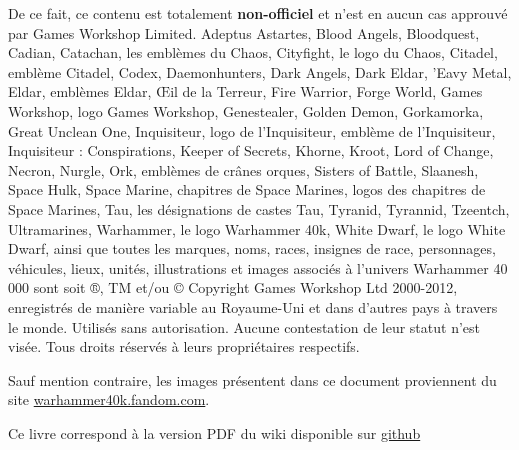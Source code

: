 De ce fait, ce contenu est totalement \textbf{non-officiel} et n'est en aucun cas approuvé par Games Workshop Limited. Adeptus Astartes, Blood Angels, Bloodquest, Cadian, Catachan, les emblèmes du Chaos, Cityfight, le logo du Chaos, Citadel, emblème Citadel, Codex, Daemonhunters, Dark Angels, Dark Eldar, 'Eavy Metal, Eldar, emblèmes Eldar, Œil de la Terreur, Fire Warrior, Forge World, Games Workshop, logo Games Workshop, Genestealer, Golden Demon, Gorkamorka, Great Unclean One, Inquisiteur, logo de l'Inquisiteur, emblème de l'Inquisiteur, Inquisiteur : Conspirations, Keeper of Secrets, Khorne, Kroot, Lord of Change, Necron, Nurgle, Ork, emblèmes de crânes orques, Sisters of Battle, Slaanesh, Space Hulk, Space Marine, chapitres de Space Marines, logos des chapitres de Space Marines, Tau, les désignations de castes Tau, Tyranid, Tyrannid, Tzeentch, Ultramarines, Warhammer, le logo Warhammer 40k, White Dwarf, le logo White Dwarf, ainsi que toutes les marques, noms, races, insignes de race, personnages, véhicules, lieux, unités, illustrations et images associés à l'univers Warhammer 40 000 sont soit ®, TM et/ou © Copyright Games Workshop Ltd 2000-2012, enregistrés de manière variable au Royaume-Uni et dans d'autres pays à travers le monde. Utilisés sans autorisation. Aucune contestation de leur statut n'est visée. Tous droits réservés à leurs propriétaires respectifs.

Sauf mention contraire, les images présentent dans ce document proviennent du site \href{https://warhammer40k.fandom.com}{warhammer40k.fandom.com}.

Ce livre correspond à la version PDF du wiki disponible sur \href{https://drdam.github.io/dnd2w40k/}{github}

\clearpage
